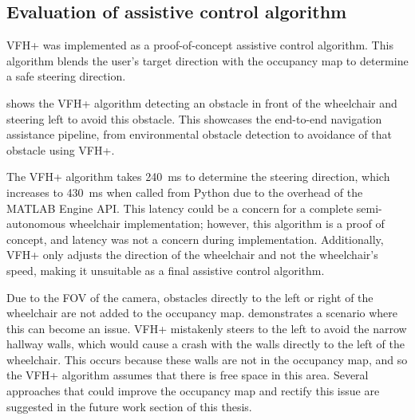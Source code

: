 
\subsection{Evaluation of assistive control algorithm}
VFH+ was implemented as a proof-of-concept assistive control algorithm.
This algorithm blends the user's target direction with the occupancy map
to determine a safe steering direction.

 shows the VFH+ algorithm detecting an obstacle in front of
the wheelchair and steering left to avoid this obstacle. This
showcases the end-to-end navigation assistance pipeline,
from environmental obstacle detection to
avoidance of that obstacle using VFH+.

The VFH+ algorithm takes
\SI{240}{\milli\second} to determine the steering direction, which increases to
\SI{430}{\milli\second} when called from Python due to the overhead of the MATLAB Engine API.
This latency could be a concern for a complete semi-autonomous wheelchair implementation;
however, this algorithm is a proof of concept, and latency was not a concern during implementation.
Additionally, VFH+ only adjusts the direction of the wheelchair and not the wheelchair's speed,
making it unsuitable as a final assistive control algorithm.

Due to the FOV of the camera, obstacles directly to the left or right of the wheelchair are not added
to the occupancy map.  demonstrates a scenario where this can
become an issue. VFH+ mistakenly steers to the left to avoid the narrow hallway walls,
which would cause a crash with the walls directly to the left of the wheelchair.
This occurs because these walls are not in the occupancy map, and so the VFH+ algorithm
assumes that there is free space in this area.
Several approaches that could improve the occupancy map and rectify this issue
are suggested in the future work section of this thesis.

